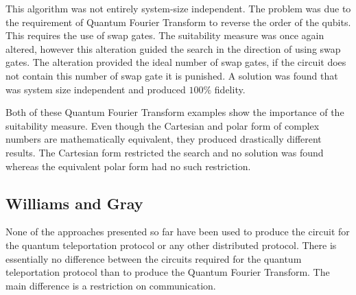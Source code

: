This algorithm was not entirely system-size independent.
The problem was due to the requirement of Quantum Fourier Transform to reverse the order of the qubits.
This requires the use of swap gates.
The suitability measure was once again altered, however this alteration guided the search in the direction of using swap gates.
The alteration provided the ideal number of swap gates, if the circuit does not contain this number of swap gate it is punished.
A solution was found that was system size independent and produced $100\%$ fidelity.

Both of these Quantum Fourier Transform examples show the importance of the suitability measure.
Even though the Cartesian and polar form of complex numbers are mathematically equivalent, they produced drastically different results.
The Cartesian form restricted the search and no solution was found whereas the equivalent polar form had no such restriction.
% 

\subsection{Williams and Gray}
None of the approaches presented so far have been used to produce the circuit for the quantum teleportation protocol or any other distributed protocol.
There is essentially no difference between the circuits required for the quantum teleportation protocol than to produce the Quantum Fourier Transform.
The main difference is a restriction on communication.

